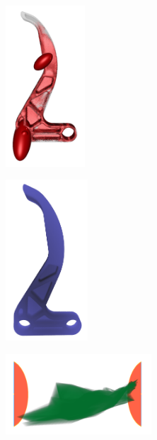 \documentclass[a4paper,fontsize=12pt,toc=bib,halfparskip]{scrartcl}
\begin{document}
\begin{figure}[H]
	\begin{subfigure}{0.49\textwidth}
		\centering
		\includegraphics[height=6cm]{pictures/results/Bremshebel_Ellipsoids.png}
		\subcaption{}
		\label{BremshebelEllipsoidsK}
	\end{subfigure}
	\hspace*{\fill}
	\begin{subfigure}{0.49\textwidth}
		\centering
		\includegraphics[height=6cm]{pictures/results/Bremshebel_R_Object.png}
		\subcaption{}
		\label{BremshebelObjectK}
	\end{subfigure}
	\vspace{1cm}
	\begin{subfigure}{0.49\textwidth}
		\centering
		\includegraphics[height=3cm]{pictures/results/Bremshebel_K_InvariantSpace.png}
		\subcaption{}
		\label{BremshebelInvariantSpaceK}
	\end{subfigure}
	\hspace*{\fill}
	\begin{subfigure}{0.49\textwidth}

\end{subfigure}
\end{figure}
\end{document}
